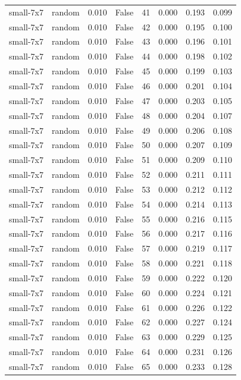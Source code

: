\begin{tabular}{llrrrrrr}
small-7x7 & random & 0.010 & False & 41 & 0.000 & 0.193 & 0.099 \\
small-7x7 & random & 0.010 & False & 42 & 0.000 & 0.195 & 0.100 \\
small-7x7 & random & 0.010 & False & 43 & 0.000 & 0.196 & 0.101 \\
small-7x7 & random & 0.010 & False & 44 & 0.000 & 0.198 & 0.102 \\
small-7x7 & random & 0.010 & False & 45 & 0.000 & 0.199 & 0.103 \\
small-7x7 & random & 0.010 & False & 46 & 0.000 & 0.201 & 0.104 \\
small-7x7 & random & 0.010 & False & 47 & 0.000 & 0.203 & 0.105 \\
small-7x7 & random & 0.010 & False & 48 & 0.000 & 0.204 & 0.107 \\
small-7x7 & random & 0.010 & False & 49 & 0.000 & 0.206 & 0.108 \\
small-7x7 & random & 0.010 & False & 50 & 0.000 & 0.207 & 0.109 \\
small-7x7 & random & 0.010 & False & 51 & 0.000 & 0.209 & 0.110 \\
small-7x7 & random & 0.010 & False & 52 & 0.000 & 0.211 & 0.111 \\
small-7x7 & random & 0.010 & False & 53 & 0.000 & 0.212 & 0.112 \\
small-7x7 & random & 0.010 & False & 54 & 0.000 & 0.214 & 0.113 \\
small-7x7 & random & 0.010 & False & 55 & 0.000 & 0.216 & 0.115 \\
small-7x7 & random & 0.010 & False & 56 & 0.000 & 0.217 & 0.116 \\
small-7x7 & random & 0.010 & False & 57 & 0.000 & 0.219 & 0.117 \\
small-7x7 & random & 0.010 & False & 58 & 0.000 & 0.221 & 0.118 \\
small-7x7 & random & 0.010 & False & 59 & 0.000 & 0.222 & 0.120 \\
small-7x7 & random & 0.010 & False & 60 & 0.000 & 0.224 & 0.121 \\
small-7x7 & random & 0.010 & False & 61 & 0.000 & 0.226 & 0.122 \\
small-7x7 & random & 0.010 & False & 62 & 0.000 & 0.227 & 0.124 \\
small-7x7 & random & 0.010 & False & 63 & 0.000 & 0.229 & 0.125 \\
small-7x7 & random & 0.010 & False & 64 & 0.000 & 0.231 & 0.126 \\
small-7x7 & random & 0.010 & False & 65 & 0.000 & 0.233 & 0.128 \\

\end{tabular}
